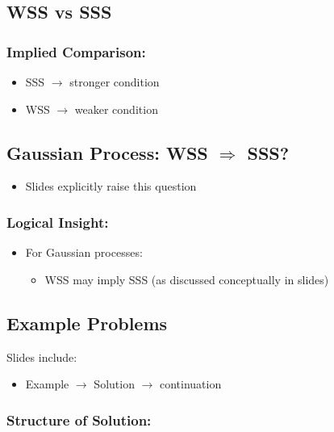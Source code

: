 \documentclass[12pt]{article}
\begin{document}
\subsection{WSS vs SSS}

\subsubsection*{Implied Comparison:}

\begin{itemize}
    \item SSS $\rightarrow$ stronger condition
    \item WSS $\rightarrow$ weaker condition
\end{itemize}

\subsection{Gaussian Process: WSS $\Rightarrow$ SSS?}

\begin{itemize}
    \item Slides explicitly raise this question
\end{itemize}

\subsubsection*{Logical Insight:}

\begin{itemize}
    \item For Gaussian processes:
    \begin{itemize}
        \item WSS may imply SSS (as discussed conceptually in slides)
    \end{itemize}
\end{itemize}

\subsection{Example Problems}

Slides include:

\begin{itemize}
    \item Example $\rightarrow$ Solution $\rightarrow$ continuation
\end{itemize}

\subsubsection*{Structure of Solution:}
\end{document}
